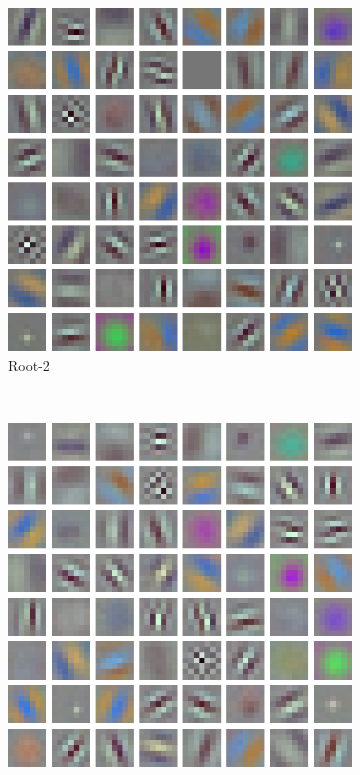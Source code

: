 \documentclass[thesis]{subfiles}
\begin{document}
\begin{figure}[tb]
\begin{subfigure}[b]{0.45\textwidth}
			\includegraphics[width=\textwidth]{Figs/Raster/msrc-resnet-50-conv1-root4-convonly}
			\caption{Root-2}
			\label{fig:resnet50root2conv0}
		\end{subfigure}
		~
		\begin{subfigure}[b]{0.45\textwidth}
			\centering
			\includegraphics[width=\textwidth]{Figs/Raster/msrc-resnet-50-conv1-root8-convonly}

\end{subfigure}
\end{figure}
\end{document}
